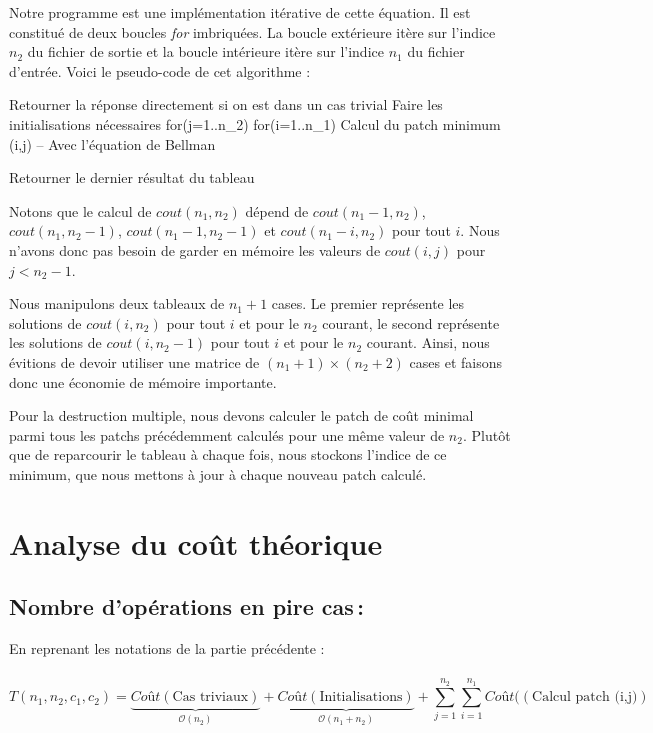 \documentclass[a4paper, 10pt, french]{article}
\newcommand{\cplx}[1]{\mathcal O \left( #1 \right)}
\begin{document}
Notre programme est une implémentation itérative de cette équation. Il est constitué
de deux boucles \emph{for} imbriquées. La boucle extérieure itère sur l'indice $n_2$
du fichier de sortie et la boucle intérieure itère sur l'indice $n_1$ du fichier
d'entrée.
Voici le pseudo-code de cet algorithme :
\begin{verbatimtab}
	Retourner la réponse directement si on est dans un cas trivial
	Faire les initialisations nécessaires
	for(j=1..n_2)
	  for(i=1..n_1)
		Calcul du patch minimum (i,j) -- Avec l'équation de Bellman

	Retourner le dernier résultat du tableau
\end{verbatimtab}
Notons que le calcul de $cout(n_1, n_2)$ dépend de $cout(n_1-1, n_2)$,
$cout(n_1, n_2-1)$, $cout(n_1-1, n_2-1)$ et $cout(n_1-i, n_2)$ pour tout $i$.
Nous n'avons donc pas besoin de garder en mémoire les valeurs de $cout(i, j)$ pour
$j < n_2-1$.

Nous manipulons deux tableaux de $n_1+1$ cases. Le premier représente les solutions
de $cout(i, n_2)$ pour tout $i$ et pour le $n_2$ courant, le second représente
les solutions de $cout(i, n_2-1)$ pour tout $i$ et pour le $n_2$ courant.
Ainsi, nous évitions de devoir utiliser une matrice de $(n_1+1)\times(n_2+2)$ cases
et faisons donc une économie de mémoire importante.

Pour la destruction multiple, nous devons calculer le patch de coût minimal parmi
tous les patchs précédemment calculés pour une même valeur de $n_2$.
Plutôt que de reparcourir le tableau à chaque fois, nous stockons l'indice de
ce minimum, que nous mettons à jour à chaque nouveau patch calculé.

\section{Analyse du coût théorique}

  \subsection{Nombre  d'opérations en pire cas\,:}
    En reprenant les notations de la partie précédente : \\ \\

    \[T(n_1,n_2,c_1,c_2) = \underbrace{Coût(\text{Cas triviaux})}_{\cplx{n_2}} +
    \underbrace{Coût(\text{Initialisations})}_{\cplx{n_1+n_2}} +
    \sum_{j=1}^{n_2} \sum_{i=1}^{n_1} Coût((\text{Calcul patch (i,j)})\]
\end{document}
